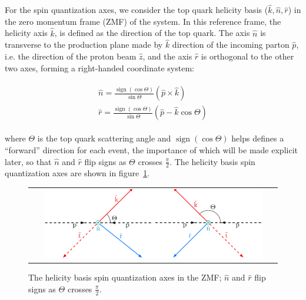 For the spin quantization axes, we consider the top quark helicity basis ($\hat{k}, \hat{n}, \hat{r}$) in the zero momentum frame (ZMF) of the \ttbar system.
In this reference frame, the helicity axis $\hat{k}$, is defined as the direction of the top quark.
The axis $\hat{n}$ is transverse to the production plane made by $\hat{k}$ direction of the incoming parton $\hat{p}$, i.e. the direction of the proton beam $\hat{z}$, and the axis $\hat{r}$ is orthogonal to the other two axes, forming a right-handed coordinate system:
\begin{linenomath*}
\begin{align}
\begin{array}{c}
\hat{n}=\frac{\operatorname{sign}(\cos \Theta)}{\sin \Theta}(\hat{p} \times \hat{k}) \\
\hat{r}=\frac{\operatorname{sign}(\cos \Theta)}{\sin \Theta}(\hat{p} - \hat{k}\cos \Theta)
\end{array}
\label{helcity_basis}
\end{align}
\end{linenomath*}
where $\Theta$ is the top quark scattering angle and $\operatorname{sign}(\cos \Theta)$ helps defines a “forward” direction for each event, the importance of which will be made explicit later, so that $\hat{n}$ and $\hat{r}$ flip signs as $\Theta$ crosses $\frac{\pi}{2}$.
The helicity basis spin quantization axes are shown in figure~\ref{helicity_basis}.
\begin{figure}[!htb]
  \begin{center}
    \begin{tabular}{c}
        \includegraphics[width=0.9\textwidth]{fig_TopQuark/helicity_basis.png}
    \end{tabular}
    \caption{The helicity basis spin quantization axes in the \ttbar ZMF;
            $\hat{n}$ and $\hat{r}$ flip signs as $\Theta$ crosses $\frac{\pi}{2}$.
            }
    \label{helicity_basis}
  \end{center}
\end{figure}

